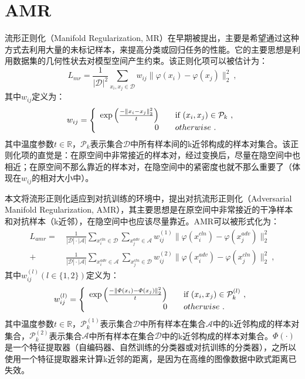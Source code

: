 \section{AMR}

流形正则化（Manifold Regularization, MR）在早期被提出，主要是希望通过这种方式去利用大量的未标记样本，来提高分类或回归任务的性能。它的主要思想是利用数据集的几何性状去对模型空间产生约束。该正则化项可以被估计为\cite{belkin2006manifold}：
\begin{equation}
    L_{mr}
    = 
    \frac{1}{|\mathcal{D}|^2} \sum_{x_i, x_j \in \mathcal{D}} w_{ij}\big\|\varphi(x_i) - \varphi(x_j)\big\|_2^2
    \ ,
\end{equation}
其中$w_{ij}$定义为：
\begin{equation}
    w_{ij} = \left\{
    \begin{array}{rl}
    \exp \left(\frac{-\left\|x_i-x_j\right\|_2^2}{t}\right)  & \quad \textnormal{if } (x_i, x_j) \in \mathcal{P}_{k} \ ,\\
    0  & \quad otherwise \ .
    \end{array} \right.
\end{equation}
其中温度参数$t \in \mathbb{R}$，$\mathcal{P}_{k}$表示集合$\mathcal{D}$中所有样本间的k近邻构成的样本对集合。该正则化项的直觉是：在原空间中非常接近的样本对，经过变换后，尽量在隐空间中也相近；在原空间不那么靠近的样本对，在隐空间中的紧密度也就不那么重要了（体现在$w_{ij}$的相对大小中）。

本文将流形正则化适应到对抗训练的环境中，提出对抗流形正则化（Adversarial Manifold Regularization, AMR），其主要思想是在原空间中非常接近的干净样本和对抗样本（k近邻），在隐空间中也应该尽量靠近。AMR可以被形式化为：
\begin{equation}
\begin{aligned}
    L_{amr}
    = \ &
    \frac{1}{|\mathcal{D}| \cdot |\mathcal{A}|} \sum_{x_i^{cln} \in \mathcal{D}} \sum_{x_j^{adv} \in \mathcal{A}} w_{ij}^{(1)} \big\|\varphi(x_i^{cln}) - \varphi(x_j^{adv})\big\|_2^2 \\
    + & 
    \frac{1}{|\mathcal{D}| \cdot |\mathcal{A}|} \sum_{x_i^{adv} \in \mathcal{A}} \sum_{x_j^{cln} \in \mathcal{D}} w_{ij}^{(2)} \big\|\varphi(x_i^{adv}) - \varphi(x_j^{cln})\big\|_2^2
    \ ,
\end{aligned}
\end{equation}
其中$w_{ij}^{(l)}(l\in\{1, 2\})$定义为：
\begin{equation}
    w_{ij}^{(l)} = \left\{
    \begin{array}{rl}
    \exp \left(\frac{-\left\|\varPhi(x_i)-\varPhi(x_j)\right\|_2^2}{t}\right)  & \quad \textnormal{if } (x_i, x_j) \in \mathcal{P}_{k}^{(l)} \ ,\\
    0  & \quad otherwise \ .
    \end{array} \right.
\end{equation}
其中温度参数$t \in \mathbb{R}$，$\mathcal{P}_{k}^{(1)}$表示集合$\mathcal{D}$中所有样本在集合$\mathcal{A}$中的k近邻构成的样本对集合，$\mathcal{P}_{k}^{(2)}$表示集合$\mathcal{A}$中所有样本在集合$\mathcal{D}$中的k近邻构成的样本对集合。$\varPhi(\cdot)$是一个特征提取器（自编码器、自然训练的分类器或对抗训练的分类器），之所以使用一个特征提取器来计算k近邻的距离，是因为在高维的图像数据中欧式距离已失效。